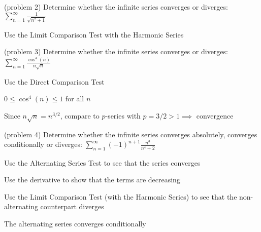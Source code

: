 \documentclass[handout]{ximera}
\begin{document}
\begin{problem}(problem 2)
Determine whether the infinite series converges or diverges: 
$\displaystyle \sum_{n=1}^\infty \frac{1}{\sqrt{n^2 + 1}}$

\begin{hint}
Use the Limit Comparison Test with the Harmonic Series
\end{hint}


\end{problem}

\begin{problem}(problem 3)
Determine whether the infinite series converges or diverges: $\displaystyle \sum_{n=1}^\infty \frac{\cos^4(n)}{n\sqrt{n}}$

\begin{hint}
Use the Direct Comparison Test
\end{hint}

\begin{hint}
$\displaystyle 0 \leq \cos^4(n) \leq 1$ for all $n$
\end{hint}

\begin{hint}
Since $n\sqrt n = n^{3/2}$, compare to $p$-series with $p = 3/2 > 1 \implies$ convergence
\end{hint}

\end{problem}

\begin{problem}(problem 4)
Determine whether the infinite series converges absolutely, converges conditionally or diverges: 
$\displaystyle \sum_{n=1}^\infty (-1)^{n+1} \frac{n^3}{n^4 + 2}$

\begin{hint}
Use the Alternating Series Test to see that the series converges
\end{hint}
\begin{hint}
Use the derivative to show that the terms are decreasing
\end{hint}
\begin{hint}
Use the Limit Comparison Test (with the Harmonic Series) to see that the 
non-alternating counterpart diverges
\end{hint}


\begin{hint}
The alternating series converges conditionally
\end{hint}

\end{problem}
\end{document}
